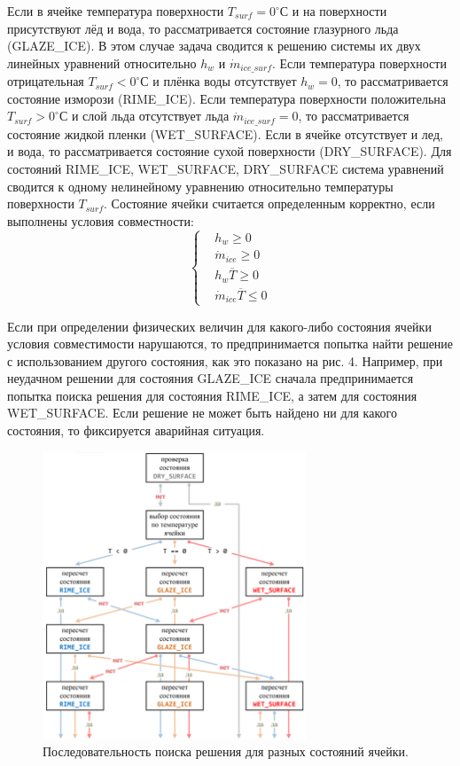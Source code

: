 \documentclass{psta}%
\begin{document}
Если в ячейке температура поверхности $T_{surf} = 0^{\circ}С$ и на поверхности присутствуют лёд и вода, то рассматривается состояние глазурного льда (GLAZE\_ICE).
В этом случае задача сводится к решению системы их двух линейных  уравнений относительно $h_w$ и $\dot{m}_{ice\_surf}$.
Если температура поверхности отрицательная $T_{surf} < 0^{\circ}С$ и плёнка воды отсутствует $h_w = 0$, то рассматривается состояние изморози (RIME\_ICE).
Если температура поверхности положительна $T_{surf} > 0^{\circ}С$ и слой льда отсутствует льда $\dot{m}_{ice\_surf} = 0$, то рассматривается состояние жидкой пленки (WET\_SURFACE).
Если в ячейке отсутствует и лед, и вода, то рассматривается состояние сухой поверхности (DRY\_SURFACE).
Для состояний RIME\_ICE, WET\_SURFACE, DRY\_SURFACE система уравнений сводится к одному нелинейному уравнению относительно температуры поверхности $T_{surf}$. 
Состояние ячейки считается определенным корректно, если выполнены условия совместности:
\begin{equation*}
	\begin{cases}
		& h_w \ge 0 \\
		& \dot{m}_{ice} \ge 0 \\
		& h_w \overline{T} \ge 0 \\
		& \dot{m}_{ice} \overline{T} \le 0
	\end{cases}
\end{equation*}

Если при определении физических величин для какого-либо состояния ячейки условия совместимости нарушаются, то предпринимается попытка найти решение с использованием другого состояния, как это показано на рис. 4.
Например, при неудачном решении для состояния GLAZE\_ICE сначала предпринимается попытка поиска решения для состояния RIME\_ICE, а затем для состояния WET\_SURFACE. Если решение не может быть найдено ни для какого состояния, то фиксируется аварийная ситуация.

\begin{figure}[ht]
\centering
\includegraphics[width=0.7\textwidth]{pics/scheme.png}
\caption{Последовательность поиска решения для разных состояний ячейки.}
\label{fig:scheme}
\end{figure}
\end{document}

